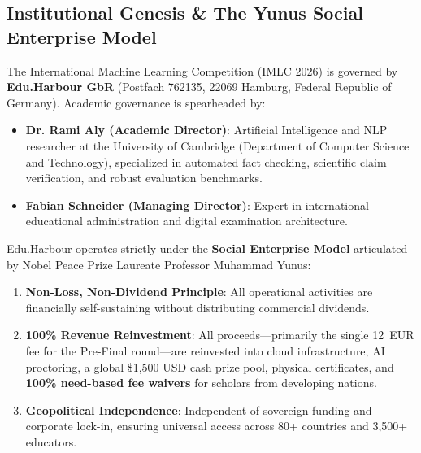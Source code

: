 \documentclass[11pt,a4paper]{article}
\theoremstyle{definition}
\theoremstyle{plain}
\theoremstyle{remark}
\begin{document}
\subsection{Institutional Genesis \& The Yunus Social Enterprise Model}
The International Machine Learning Competition (IMLC 2026) is governed by \textbf{Edu.Harbour GbR} (Postfach 762135, 22069 Hamburg, Federal Republic of Germany). Academic governance is spearheaded by:
\begin{itemize}[noitemsep]
    \item \textbf{Dr. Rami Aly (Academic Director)}: Artificial Intelligence and NLP researcher at the University of Cambridge (Department of Computer Science and Technology), specialized in automated fact checking, scientific claim verification, and robust evaluation benchmarks.
    \item \textbf{Fabian Schneider (Managing Director)}: Expert in international educational administration and digital examination architecture.
\end{itemize}

Edu.Harbour operates strictly under the \textbf{Social Enterprise Model} articulated by Nobel Peace Prize Laureate Professor Muhammad Yunus:
\begin{enumerate}[noitemsep]
    \item \textbf{Non-Loss, Non-Dividend Principle}: All operational activities are financially self-sustaining without distributing commercial dividends.
    \item \textbf{100\% Revenue Reinvestment}: All proceeds---primarily the single 12~EUR fee for the Pre-Final round---are reinvested into cloud infrastructure, AI proctoring, a global \$1,500 USD cash prize pool, physical certificates, and \textbf{100\% need-based fee waivers} for scholars from developing nations.
    \item \textbf{Geopolitical Independence}: Independent of sovereign funding and corporate lock-in, ensuring universal access across 80+ countries and 3,500+ educators.
\end{enumerate}
\end{document}
